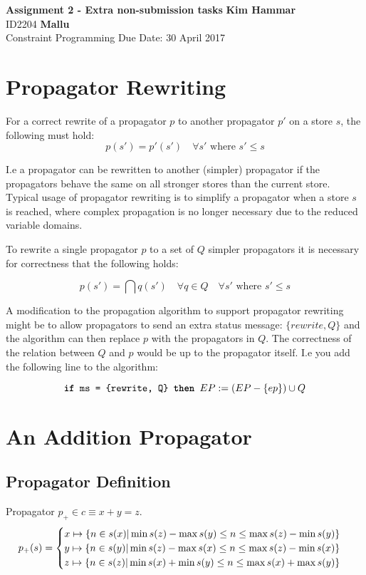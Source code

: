 \documentclass[a4paper, 11pt]{article}
\newcommand\mymapsto{\mathrel{\ooalign{$\rightarrow$\cr%
  \kern-.15ex\raise.275ex\hbox{\scalebox{1}[0.522]{$\mid$}}\cr}}}
\begin{document}
\noindent
\large\textbf{Assignment 2 - Extra non-submission tasks} \hfill \textbf{Kim Hammar} \\
\normalsize ID2204 \hfill  \textbf{Mallu} \\
Constraint Programming \hfill Due Date: 30 April 2017\\

\section*{Propagator Rewriting}
For a correct rewrite of a propagator $p$ to another propagator $p'$ on a store $s$, the following must hold:
$$p(s') = p'(s') \quad \forall s' \text{ where } s' \leq s$$

I.e a propagator can be rewritten to another (simpler) propagator if the propagators behave the same on all stronger stores than the current store. Typical usage of propagator rewriting is to simplify a propagator when a store $s$ is reached, where complex propagation is no longer necessary due to the reduced variable domains.

To rewrite a single propagator $p$ to a set of $Q$ simpler propagators it is necessary for correctness that the following holds:

$$p(s') = \displaystyle\bigcap q(s') \quad \forall q \in Q \quad \forall s' \text{ where } s' \leq s$$

A modification to the propagation algorithm to support propagator rewriting might be to allow propagators to send an extra status message: $\{rewrite, Q\}$ and the algorithm can then replace $p$ with the propagators in $Q$. The correctness of the relation between $Q$ and $p$ would be up to the propagator itself. I.e you add the following line to the algorithm:

$$\text{\texttt{\textbf{if} ms = \{rewrite, Q\} \textbf{then }}} EP:= (EP - \{ep\}) \cup Q$$

\section*{An Addition Propagator}
\subsection*{Propagator Definition}
Propagator $p_+ \in c \equiv x + y = z$.
\begin{gather*}
p_+(s) = 
\begin{cases}
  x \mymapsto \{n \in s(x) | \min s(z) - \max s(y) \leq n \leq \max s(z) - \min s(y) \}\\
  y \mymapsto \{n \in s(y) | \min s(z) - \max s(x) \leq n \leq \max s(z) - \min s(x) \}\\
  z \mymapsto \{n \in s(z) | \min s(x) + \min s(y) \leq n \leq \max s(x) + \max s(y) \}\\    
\end{cases}
\end{gather*}
\end{document}
